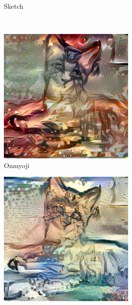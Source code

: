 \documentclass[10pt,twocolumn,letterpaper]{article}
\begin{document}
\begin{figure}
\begin{subfigure}[b]{0.18\textwidth}
    \caption{Sketch}
    \label{fig::base21}
  \end{subfigure}
  ~
  \begin{subfigure}[b]{0.18\textwidth}
    \includegraphics[width=\textwidth]{figure/baseline4/yys.jpg}
    \caption{Onmyoji}
    \label{fig::base22}
  \end{subfigure}
  \begin{subfigure}[b]{0.18\textwidth}
    \includegraphics[width=\textwidth]{figure/baseline4/fsh.jpg}

\end{subfigure}
\end{figure}
\end{document}
